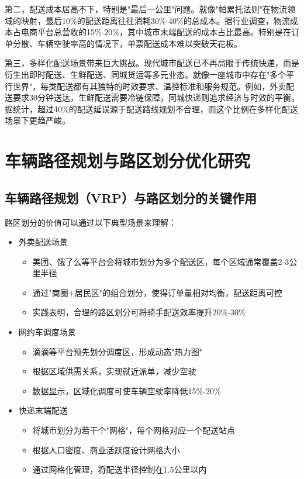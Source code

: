 \documentclass[12pt,a4paper,twoside]{ctexbook}
\begin{document}
第二，配送成本居高不下，特别是"最后一公里"问题。就像"帕累托法则"在物流领域的映射，最后10\%的配送距离往往消耗30\%-40\%的总成本。据行业调查，物流成本占电商平台总营收的15\%-20\%，其中城市末端配送的成本占比最高。特别是在订单分散、车辆空驶率高的情况下，单票配送成本难以突破天花板。

第三，多样化配送场景带来巨大挑战。现代城市配送已不再局限于传统快递，而是衍生出即时配送、生鲜配送、同城货运等多元业态。就像一座城市中存在"多个平行世界"，每类配送都有其独特的时效要求、温控标准和服务规范。例如，外卖配送要求30分钟送达，生鲜配送需要冷链保障，同城快递则追求经济与时效的平衡。据统计，超过40\%的配送延误源于配送路线规划不合理，而这个比例在多样化配送场景下更趋严峻。

\section{车辆路径规划与路区划分优化研究}

\subsection{车辆路径规划（VRP）与路区划分的关键作用}

路区划分的价值可以通过以下典型场景来理解：

\begin{itemize}
\item 外卖配送场景
    \begin{itemize}
    \item 美团、饿了么等平台会将城市划分为多个配送区，每个区域通常覆盖2-3公里半径
    \item 通过"商圈+居民区"的组合划分，使得订单量相对均衡，配送距离可控
    \item 实践表明，合理的路区划分可将骑手配送效率提升20\%-30\%
    \end{itemize}

\item 网约车调度场景
    \begin{itemize}
    \item 滴滴等平台预先划分调度区，形成动态"热力图"
    \item 根据区域供需关系，实现就近派单，减少空驶
    \item 数据显示，区域化调度可使车辆空驶率降低15\%-20\%
    \end{itemize}

\item 快递末端配送
    \begin{itemize}
    \item 将城市划分为若干个"网格"，每个网格对应一个配送站点
    \item 根据人口密度、商业活跃度设计网格大小
    \item 通过网格化管理，将配送半径控制在1.5公里以内
    \end{itemize}
\end{itemize}
\end{document}
